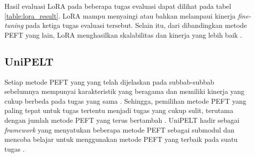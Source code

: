 \begin{table}[ht]
    \vspace{0.25cm}
    \centering
    \caption{Hasil evaluasi LoRA dengan model GPT-3 \parencite{lora}}
    \label{table:lora_result}
\end{table}

Hasil evaluasi LoRA pada beberapa tugas evaluasi dapat dilihat pada tabel \ref{table:lora_result}. LoRA mampu menyaingi atau bahkan melampaui kinerja \textit{fine-tuning} pada ketiga tugas evaluasi tersebut. Selain itu, dari dibandingkan metode PEFT yang lain, LoRA menghasilkan skalabilitas dan kinerja yang lebih baik \parencite{lora}.

\subsection{UniPELT}

Setiap metode PEFT yang yang telah dijelaskan pada subbab-subbab sebelumnya mempunyai karakteristik yang beragama dan memiliki kinerja yang cukup berbeda pada tugas yang sama \parencite{unipelt}. Sehingga, pemilihan metode PEFT yang paling tepat untuk tugas tertentu menjadi tugas yang cukup sulit, terutama dengan jumlah metode PEFT yang terus bertambah \parencite{unipelt}. UniPELT hadir sebagai \textit{framework} yang menyatukan beberapa metode PEFT sebagai submodul dan mencoba belajar untuk menggunakan metode PEFT yang terbaik pada suatu tugas \parencite{unipelt}.

